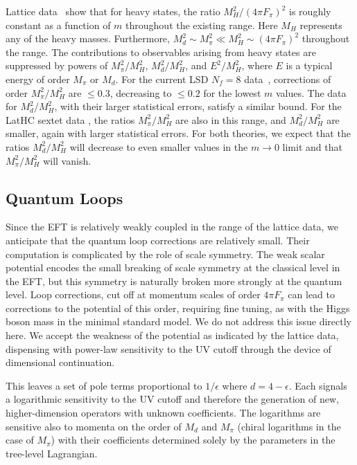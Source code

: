 \documentclass[a4paper,11pt]{article}
\begin{document}
Lattice data~\cite{LSD,FHKMNW2} show that for heavy states, the ratio $M_H^2/(4 \pi F_{\pi}) ^2$ is roughly constant as a function of $m$ throughout the existing range. Here $M_H$ represents any of the heavy masses. Furthermore, $M_d^2 \sim M_{\pi}^2 \ll M_H^2 \sim (4 \pi F_{\pi})^2$ throughout the range. The contributions to observables arising from heavy states are suppressed by powers of $M_{\pi}^2 / M_H^2$, $M_{d}^2 / M_H^2$, and $E^2 / M_H^2$, where $E$ is a typical energy of order $M_{\pi}$ or $M_{d}$. For the current LSD $N_f = 8$ data~\cite{LSD}, corrections of order $M_{\pi}^2 / M_H^2$ are $ \leq 0.3$, decreasing to $\leq 0.2$ for the lowest $m$ values. The data for $M_{d}^2 / M_H^2$, with their larger statistical errors, satisfy a similar bound. For the LatHC sextet data \cite{FHKMNW2}, the ratios $M_{\pi}^2 / M_H^2$ are also in this range, and $M_{d}^2 / M_H^2$ are smaller, again with larger statistical errors. For both theories, we expect that the ratios $M_{d}^2 / M_H^2$ will decrease to even smaller values in the $m\rightarrow0$ limit and that $M_{\pi}^2 / M_H^2$ will vanish.
  

\subsection{Quantum Loops} 

Since the EFT is relatively weakly coupled in the range of the lattice data, we anticipate that the quantum loop corrections are relatively small. Their computation is complicated by the role of scale symmetry. The weak scalar potential encodes the small breaking of scale symmetry at the classical level in the EFT, but this symmetry is naturally broken more strongly at the quantum level. Loop corrections, cut off at momentum scales of order $4 \pi F_{\pi}$ can lead to corrections to the potential of this order, requiring fine tuning, as with the Higgs boson mass in the minimal standard model. We do not address this issue directly here. We accept the weakness of the potential as indicated by the lattice data, dispensing with power-law sensitivity to the UV cutoff through the device of dimensional continuation.

This leaves a set of pole terms proportional to $1/\epsilon$ where $d = 4 -\epsilon$. Each signals a logarithmic sensitivity to the UV cutoff and therefore the generation of new, higher-dimension operators with unknown coefficients.  The logarithms are sensitive also to momenta on the order of $M_d$ and $M_{\pi}$ (chiral logarithms in the case of $M_{\pi}$) with their coefficients determined solely by the parameters in the tree-level Lagrangian.
\end{document}
